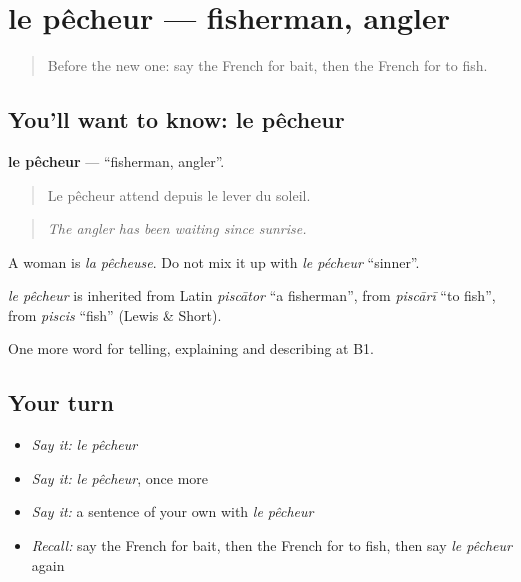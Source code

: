 \section[le pêcheur]{le pêcheur — fisherman, angler}

\label{lesson:FR-C497-pecheur}



\begin{quote}
Before the new one: say the French for bait, then the French for to fish.
\end{quote}

\subsection*{You'll want to know: le pêcheur}
\textbf{le pêcheur} — \textquotedblleft{}fisherman, angler\textquotedblright{}.

\begin{quote}
Le pêcheur attend depuis le lever du soleil.
\end{quote}

\begin{quote}
\emph{The angler has been waiting since sunrise.}
\end{quote}

A woman is \emph{la pêcheuse}. Do not mix it up with \emph{le pécheur} \textquotedblleft{}sinner\textquotedblright{}.

\begin{cousinweb}
\emph{le pêcheur} is inherited from Latin \emph{piscātor} \textquotedblleft{}a fisherman\textquotedblright{}, from \emph{piscārī} \textquotedblleft{}to fish\textquotedblright{}, from \emph{piscis} \textquotedblleft{}fish\textquotedblright{} (Lewis \& Short).
\end{cousinweb}

\begin{grammarlens}[title={What you've built}]
One more word for telling, explaining and describing at B1.
\end{grammarlens}

\subsection*{Your turn}
\begin{itemize}
\raggedright
  \item \emph{Say it:} \emph{le pêcheur}
  \item \emph{Say it:} \emph{le pêcheur}, once more
  \item \emph{Say it:} a sentence of your own with \emph{le pêcheur}
  \item \emph{Recall:} say the French for bait, then the French for to fish, then say \emph{le pêcheur} again
\end{itemize}

